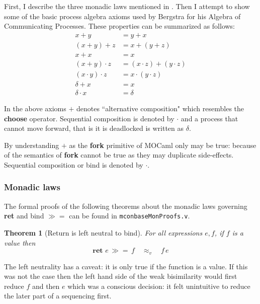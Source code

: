 \documentclass[12pt,twoside,notitlepage]{report}
\theoremstyle{plain}%
\newtheorem{thm}{Theorem}[section]
\theoremstyle{definition}
\theoremstyle{remark}
\begin{document}
First, I describe the three monadic laws mentioned in . Then I attempt to show some of the basic process algebra axioms used by Bergstra for his Algebra of Communicating Processes\cite{bergstra1986algebra,bergstra1984process}. These properties can be summarized as follows:
\begin{align}
x + y &= y + x \label{eq:fork_comm}\\
(x + y) + z &= x + (y + z) \label{eq:fork_assoc}\\
x + x &= x \label{eq:choice_id}\\
(x + y)\cdot z &= (x \cdot z) + (y \cdot z) \label{eq:fork_bind_distribute}\\
(x \cdot y)\cdot z &= x \cdot (y \cdot z) \label{eq:bind_assoc}\\
\delta + x &= x \label{eq:fork_deadlock} \\
\delta \cdot x &= \delta \label{eq:bind_deadlock}
\end{align}

In the above axioms $ + $ denotes ``alternative composition" which resembles the \textbf{choose} operator. Sequential composition is denoted by $ \cdot $ and a process that cannot move forward, that is it is deadlocked is written as $ \delta $. 

By understanding $ + $ as the \textbf{fork} primitive of MOCaml only  may be true: because of the semantics of \textbf{fork}  cannot be true as they may duplicate side-effects. Sequential composition or bind is denoted by $ \cdot $.

\subsubsection{Monadic laws}
The formal proofs of the following theorems about the monadic laws governing \textbf{ret} and bind $ \gg= $ can be found in \verb|mconbaseMonProofs.v|.

\begin{thm}[Return is left neutral to bind]
For all expressions $ e, f $, if $ f $ is a value then
\[ \textbf{ret } e\,\gg=\, f\quad \approx_v \quad f\,e \]
\end{thm}

The left neutrality has a caveat: it is only true if the function is a value. If this was not the case then the left hand side of the weak bisimilarity would first reduce $ f $ and then $ e $ which was a conscious decision: it felt unintuitive to reduce the later part of a sequencing first. 
\end{document}
